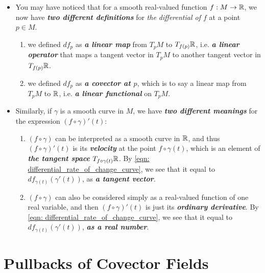 \documentclass[11pt]{article}
\begin{document}
\begin{itemize}
\item \begin{remark}
You may have noticed that for a smooth real-valued function $f: M \rightarrow {\mathbb R}$, we now have \emph{\textbf{two different definitions}} for \emph{the differential of $f$} at a point $p \in M$. 
\begin{enumerate}
\item we defined $df_p$ as \emph{\textbf{a linear map}} from $T_{p}M$ to $T_{f(p)}{\mathbb R}$, i.e. \emph{\textbf{a linear operator}} that maps a tangent vector in $T_pM$ to another tangent vector in $T_{f(p)}{\mathbb R}$.
\item we defined $df_p$ as \emph{\textbf{a covector at $p$}}, which is to say a linear map from $T_{p}M$ to ${\mathbb R}$, i.e. \emph{\textbf{a linear functional}} on $T_pM$.
\end{enumerate}
\end{remark}

\item \begin{remark}
Similarly, if $\gamma$ is a smooth curve in $M$, we have \textbf{\emph{two different meanings}} for the expression $(f \circ  \gamma)'(t)$:
 \begin{enumerate}
 \item $(f \circ \gamma)$ can be interpreted as a smooth curve in ${\mathbb R}$, and thus $(f \circ  \gamma)'(t)$ is its \emph{\textbf{velocity}} at the point $f \circ  \gamma(t)$, which is an element of \emph{\textbf{the tangent space}}  $T_{f\circ\gamma(t)}{\mathbb R}$.  By \eqref{eqn: differential_rate_of_change_curve}, we see that it equal to $df_{\gamma(t)}(\gamma'(t))$, as \emph{\textbf{a tangent vector}}.
 \item $(f \circ \gamma)$ can also be considered simply as a real-valued function of one real variable, and then $(f \circ  \gamma)'(t)$ is just its \emph{\textbf{ordinary derivative}}. By \eqref{eqn: differential_rate_of_change_curve}, we see that it equal to $df_{\gamma(t)}(\gamma'(t))$, \emph{\textbf{as a real number}}.
 \end{enumerate}
\end{remark}
\end{itemize}


\section{Pullbacks of Covector Fields}
\end{document}
